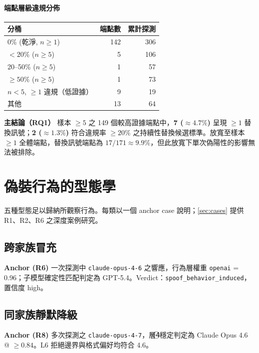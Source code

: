 \documentclass[UTF8,fontset=none,10pt,a4paper,twocolumn]{ctexart}
\begin{document}
\paragraph{端點層級違規分佈}
\begin{table}[h]
\centering
\small
\begin{tabular}{@{}lrr@{}}
\toprule
分桶 & 端點數 & 累計探測 \\
\midrule
0\% (乾淨, $n{\geq}1$) & 142 & 306 \\
$<20\%$ ($n{\geq}5$) & 5 & 106 \\
20--50\% ($n{\geq}5$) & 1 & 57 \\
${\geq} 50\%$ ($n{\geq}5$) & 1 & 73 \\
$n{<}5$, ${\geq}1$ 違規（低證據） & 9 & 19 \\
其他 & 13 & 64 \\
\bottomrule
\end{tabular}
\end{table}

\textbf{主結論（RQ1）} 樣本 ${\geq}5$ 之 149 個較高證據端點中，\textbf{7 ($\approx 4.7\%$)} 呈現 ${\geq}1$ 替換訊號；\textbf{2 ($\approx 1.3\%$)} 符合違規率 ${\geq}20\%$ 之持續性替換候選標準。放寬至樣本 ${\geq}1$ 全體端點，替換訊號端點為 $17/171 \approx 9.9\%$，但此放寬下單次偽陽性的影響無法被排除。

\section{偽裝行為的型態學}\label{sec:taxonomy}

五種型態足以歸納所觀察行為。每類以一個 anchor case 說明；\cref{sec:cases} 提供 R1、R2、R6 之深度案例研究。

\subsection{跨家族冒充}
\textbf{Anchor (R6)} 一次探測中 \texttt{claude-opus-4-6} 之響應，行為層權重 \texttt{openai} = 0.96；子模型確定性匹配判定為 GPT-5.4。Verdict：\texttt{spoof\_behavior\_induced}，置信度 high。

\subsection{同家族靜默降級}
\textbf{Anchor (R8)} 多次探測之 \texttt{claude-opus-4-7}，層\textcircled{\scriptsize 4}穩定判定為 Claude Opus 4.6 @ ${\geq} 0.84$。L6 拒絕邊界與格式偏好均符合 4.6。
\end{document}
